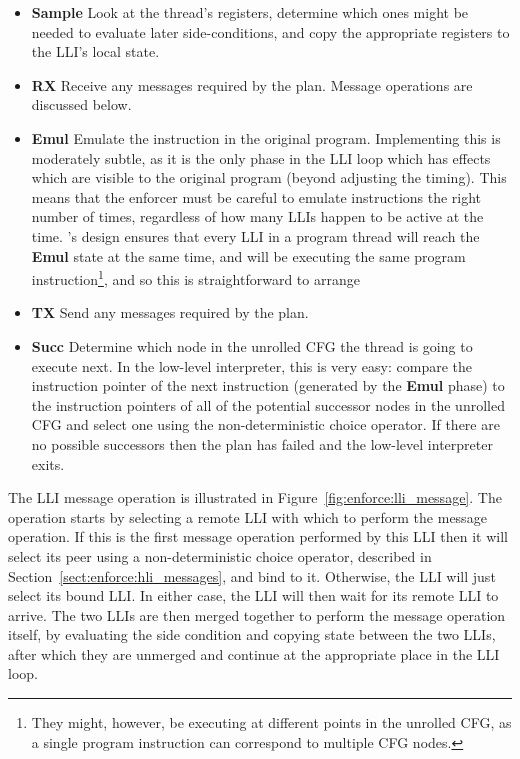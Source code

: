 \begin{itemize}
\item \textbf{Sample} Look at the thread's registers, determine which
  ones might be needed to evaluate later side-conditions, and copy the
  appropriate registers to the LLI's local state.

\item \textbf{RX} Receive any messages required by the plan.  Message
  operations are discussed below.

\item \textbf{Emul} Emulate the instruction in the original program.
  Implementing this is moderately subtle, as it is the only phase in
  the LLI loop which has effects which are visible to the original
  program (beyond adjusting the timing).  This means that the enforcer
  must be careful to emulate instructions the right number of times,
  regardless of how many LLIs happen to be active at the time.
  {\Technique}'s design ensures that every LLI in a program thread
  will reach the \textbf{Emul} state at the same time, and will be
  executing the same program instruction\footnote{They might, however,
    be executing at different points in the unrolled CFG, as a single
    program instruction can correspond to multiple CFG nodes.}, and so
  this is straightforward to arrange

\item \textbf{TX} Send any messages required by the plan.

\item \textbf{Succ} Determine which node in the unrolled CFG the
  thread is going to execute next.  In the low-level interpreter, this
  is very easy: compare the instruction pointer of the next
  instruction (generated by the \textbf{Emul} phase) to the
  instruction pointers of all of the potential successor nodes in the
  unrolled CFG and select one using the non-deterministic choice
  operator.  If there are no possible successors then the plan has
  failed and the low-level interpreter exits.
\end{itemize}

The LLI message operation is illustrated in
Figure~\ref{fig:enforce:lli_message}.  The operation starts by
selecting a remote LLI with which to perform the message operation.
If this is the first message operation performed by this LLI then it
will select its peer using a non-deterministic choice operator,
described in Section~\ref{sect:enforce:hli_messages}, and bind to it.
Otherwise, the LLI will just select its bound LLI.  In either case,
the LLI will then wait for its remote LLI to arrive.  The two LLIs are
then merged together to perform the message operation itself, by
evaluating the side condition and copying state between the two LLIs,
after which they are unmerged and continue at the appropriate place in
the LLI loop.

